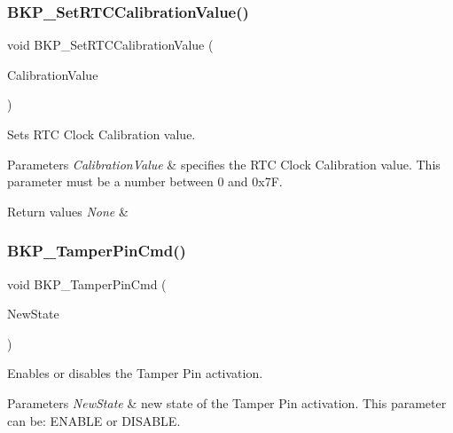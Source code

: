 \subsubsection{\texorpdfstring{BKP\_SetRTCCalibrationValue()}{BKP\_SetRTCCalibrationValue()}}
{\footnotesize\ttfamily void B\+K\+P\+\_\+\+Set\+R\+T\+C\+Calibration\+Value (\begin{DoxyParamCaption}\item[{uint8\+\_\+t}]{Calibration\+Value }\end{DoxyParamCaption})}



Sets R\+TC Clock Calibration value. 


\begin{DoxyParams}{Parameters}
{\em Calibration\+Value} & specifies the R\+TC Clock Calibration value. This parameter must be a number between 0 and 0x7F. \\
\hline
\end{DoxyParams}

\begin{DoxyRetVals}{Return values}
{\em None} & \\
\hline
\end{DoxyRetVals}
\mbox{\label{group___b_k_p___exported___functions_ga3a0cdff9ad8238ade2c67e2b70f530ac}} 
\subsubsection{\texorpdfstring{BKP\_TamperPinCmd()}{BKP\_TamperPinCmd()}}
{\footnotesize\ttfamily void B\+K\+P\+\_\+\+Tamper\+Pin\+Cmd (\begin{DoxyParamCaption}\item[{\mbox{\hyperlink{group___exported__types_gac9a7e9a35d2513ec15c3b537aaa4fba1}{Functional\+State}}}]{New\+State }\end{DoxyParamCaption})}



Enables or disables the Tamper Pin activation. 


\begin{DoxyParams}{Parameters}
{\em New\+State} & new state of the Tamper Pin activation. This parameter can be\+: E\+N\+A\+B\+LE or D\+I\+S\+A\+B\+LE. \\
\hline
\end{DoxyParams}

